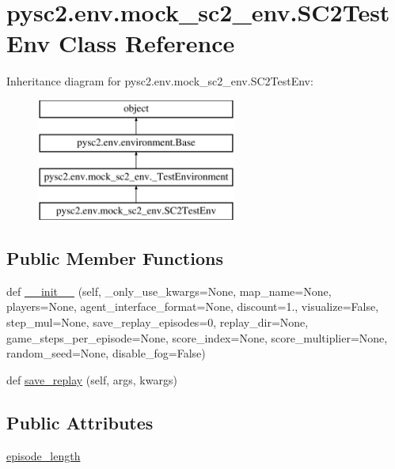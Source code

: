 \hypertarget{classpysc2_1_1env_1_1mock__sc2__env_1_1_s_c2_test_env}{}\section{pysc2.\+env.\+mock\+\_\+sc2\+\_\+env.\+S\+C2\+Test\+Env Class Reference}
\label{classpysc2_1_1env_1_1mock__sc2__env_1_1_s_c2_test_env}
Inheritance diagram for pysc2.\+env.\+mock\+\_\+sc2\+\_\+env.\+S\+C2\+Test\+Env\+:\begin{figure}[H]
\begin{center}
\leavevmode
\includegraphics[height=4.000000cm]{classpysc2_1_1env_1_1mock__sc2__env_1_1_s_c2_test_env}
\end{center}
\end{figure}
\subsection*{Public Member Functions}
\begin{DoxyCompactItemize}
\item 
def \mbox{\hyperlink{classpysc2_1_1env_1_1mock__sc2__env_1_1_s_c2_test_env_a1b3b490081a13ad71d95e11ea649c467}{\+\_\+\+\_\+init\+\_\+\+\_\+}} (self, \+\_\+only\+\_\+use\+\_\+kwargs=None, map\+\_\+name=None, players=None, agent\+\_\+interface\+\_\+format=None, discount=1., visualize=False, step\+\_\+mul=None, save\+\_\+replay\+\_\+episodes=0, replay\+\_\+dir=None, game\+\_\+steps\+\_\+per\+\_\+episode=None, score\+\_\+index=None, score\+\_\+multiplier=None, random\+\_\+seed=None, disable\+\_\+fog=False)
\item 
def \mbox{\hyperlink{classpysc2_1_1env_1_1mock__sc2__env_1_1_s_c2_test_env_ad9a54c6db41759dbfd25d042552fbb61}{save\+\_\+replay}} (self, args, kwargs)
\end{DoxyCompactItemize}
\subsection*{Public Attributes}
\begin{DoxyCompactItemize}
\item 
\mbox{\hyperlink{classpysc2_1_1env_1_1mock__sc2__env_1_1_s_c2_test_env_a21adbb6c71fbb4da2f27281744f06fa6}{episode\+\_\+length}}
\end{DoxyCompactItemize}


